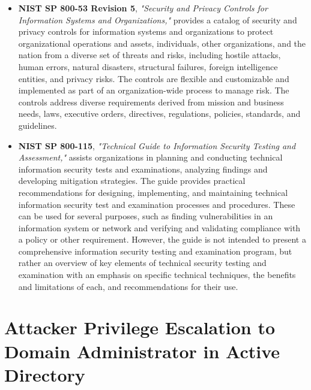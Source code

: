 \begin{itemize}
    \item \textbf{NIST SP 800-53 Revision 5}, \textit{"Security and Privacy Controls for Information Systems and Organizations,"} provides a catalog of security and privacy controls for information systems and organizations to protect organizational operations and assets, individuals, other organizations, and the nation from a diverse set of threats and risks, including hostile attacks, human errors, natural disasters, structural failures, foreign intelligence entities, and privacy risks. The controls are flexible and customizable and implemented as part of an organization-wide process to manage risk. The controls address diverse requirements derived from mission and business needs, laws, executive orders, directives, regulations, policies, standards, and guidelines.
    \item \textbf{NIST SP 800-115}, \textit{"Technical Guide to Information Security Testing and Assessment,"} assists organizations in planning and conducting technical information security tests and examinations, analyzing findings and developing mitigation strategies. The guide provides practical recommendations for designing, implementing, and maintaining technical information security test and examination processes and procedures. These can be used for several purposes, such as finding vulnerabilities in an information system or network and verifying and validating compliance with a policy or other requirement. However, the guide is not intended to present a comprehensive information security testing and examination program, but rather an overview of key elements of technical security testing and examination with an emphasis on specific technical techniques, the benefits and limitations of each, and recommendations for their use.
\end{itemize}
\section{Attacker Privilege Escalation to Domain Administrator in Active Directory}
